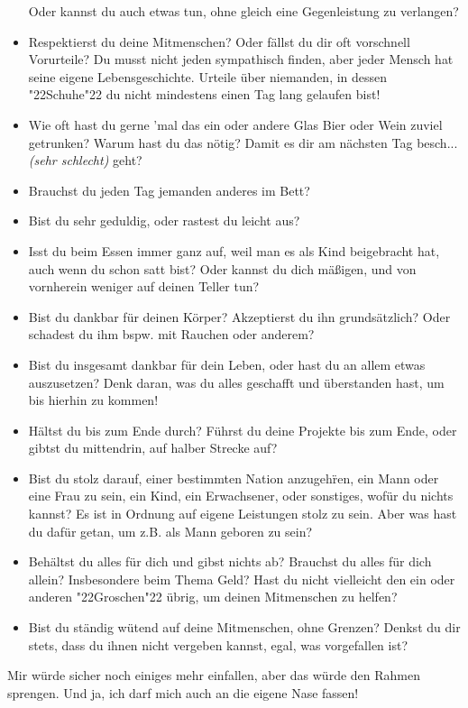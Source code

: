 \documentclass[10pt,a5paper]{article}
\newcommand{\q}[1]{\char"22{#1}\char"22 }
\begin{document}
\begin{itemize}[nosep]
					Oder kannst du auch etwas tun,
					ohne gleich eine Gegenleistung zu verlangen?
			\item	Respektierst du deine Mitmenschen?
					Oder f\"allst du dir oft vorschnell Vorurteile?
					Du musst nicht jeden sympathisch finden,
					aber jeder Mensch hat seine eigene Lebensgeschichte.
					Urteile \"uber niemanden,
					in dessen \q{Schuhe} du nicht mindestens einen Tag lang gelaufen bist!
			\item	Wie oft hast du gerne 'mal das ein oder andere Glas Bier oder Wein zuviel getrunken?
					Warum hast du das n\"otig?
					Damit es dir am n\"achsten Tag besch... \textit{(sehr schlecht)} geht?
			\item	Brauchst du jeden Tag jemanden anderes im Bett?
			\item	Bist du sehr geduldig,
					oder rastest du leicht aus?
			\item	Isst du beim Essen immer ganz auf,
					weil man es als Kind beigebracht hat,
					auch wenn du schon satt bist?
					Oder kannst du dich m\"a{\ss}igen,
					und von vornherein weniger auf deinen Teller tun?
			\item	Bist du dankbar f\"ur deinen K\"orper?
					Akzeptierst du ihn grunds\"atzlich?
					Oder schadest du ihm bspw. mit Rauchen oder anderem?
			\item	Bist du insgesamt dankbar f\"ur dein Leben,
					oder hast du an allem etwas auszusetzen?
					Denk daran,
					was du alles geschafft und \"uberstanden hast,
					um bis hierhin zu kommen!
			\item	H\"altst du bis zum Ende durch?
					F\"uhrst du deine Projekte bis zum Ende,
					oder gibtst du mittendrin,
					auf halber Strecke auf?
			\item	Bist du stolz darauf,
					einer bestimmten Nation anzugeh\"ren,
					ein Mann oder eine Frau zu sein,
					ein Kind,
					ein Erwachsener,
					oder sonstiges,
					wof\"ur du nichts kannst?
					Es ist in Ordnung auf eigene Leistungen stolz zu sein.
					Aber was hast du daf\"ur getan,
					um z.B. als Mann geboren zu sein?
			\item	Beh\"altst du alles f\"ur dich und gibst nichts ab?
					Brauchst du alles f\"ur dich allein?
					Insbesondere beim Thema Geld?
					Hast du nicht vielleicht den ein oder anderen \q{Groschen} \"ubrig,
					um deinen Mitmenschen zu helfen?
			\item	Bist du st\"andig w\"utend auf deine Mitmenschen,
					ohne Grenzen?
					Denkst du dir stets,
					dass du ihnen nicht vergeben kannst,
					egal,
					was vorgefallen ist?
					\\
		\end{itemize}
		Mir w\"urde sicher noch einiges mehr einfallen,
		aber das w\"urde den Rahmen sprengen.
		Und ja,
		ich darf mich auch an die eigene Nase fassen!
		
\end{document}
